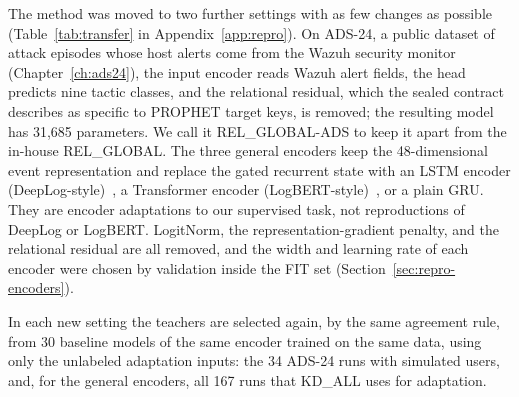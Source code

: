 The method was moved to two further settings with as few changes as
possible (Table~\ref{tab:transfer} in Appendix~\ref{app:repro}). On ADS-24, a public dataset of
attack episodes whose host alerts come from the Wazuh security monitor
(Chapter~\ref{ch:ads24}), the input encoder reads Wazuh alert fields, the head predicts nine tactic classes, and the
relational residual, which the sealed contract describes as specific to
PROPHET target keys, is removed; the resulting model has 31,685
parameters. We call it REL\_GLOBAL-ADS to keep it apart from the
in-house REL\_GLOBAL. The three general encoders keep the 48-dimensional
event representation and replace the gated recurrent state with
an LSTM encoder (DeepLog-style)~\cite{hochreiter1997long, du2017deeplog},
a Transformer encoder (LogBERT-style)~\cite{vaswani2017attention, guo2021logbert},
or a plain GRU. They are encoder adaptations to our supervised task, not
reproductions of DeepLog or LogBERT. LogitNorm, the
representation-gradient penalty, and the relational residual are all
removed, and the width and learning rate of each encoder were chosen by
validation inside the FIT set (Section~\ref{sec:repro-encoders}).


In each new setting the teachers are selected again, by the same
agreement rule, from 30 baseline models of the same encoder trained on
the same data, using only the unlabeled adaptation inputs: the 34
ADS-24 runs with simulated users, and, for the general encoders, all
167 runs that KD\_ALL uses for adaptation.
